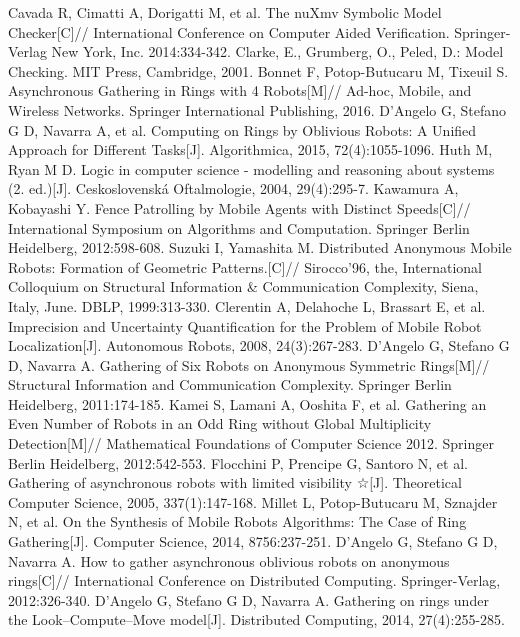 \begin{thebibliography}{0}
   Cavada R, Cimatti A, Dorigatti M, et al. The nuXmv Symbolic Model Checker[C]// International Conference on Computer Aided Verification. Springer-Verlag New York, Inc. 2014:334-342.
   Clarke, E., Grumberg, O., Peled, D.: Model Checking. MIT Press, Cambridge, 2001.
   Bonnet F, Potop-Butucaru M, Tixeuil S. Asynchronous Gathering in Rings with 4 Robots[M]// Ad-hoc, Mobile, and Wireless Networks. Springer International Publishing, 2016.
   D’Angelo G, Stefano G D, Navarra A, et al. Computing on Rings by Oblivious Robots: A Unified Approach for Different Tasks[J]. Algorithmica, 2015, 72(4):1055-1096.
   Huth M, Ryan M D. Logic in computer science - modelling and reasoning about systems (2. ed.)[J]. Ceskoslovenská Oftalmologie, 2004, 29(4):295-7.
   Kawamura A, Kobayashi Y. Fence Patrolling by Mobile Agents with Distinct Speeds[C]// International Symposium on Algorithms and Computation. Springer Berlin Heidelberg, 2012:598-608.
   Suzuki I, Yamashita M. Distributed Anonymous Mobile Robots: Formation of Geometric Patterns.[C]// Sirocco'96, the, International Colloquium on Structural Information & Communication Complexity, Siena, Italy, June. DBLP, 1999:313-330.
   Clerentin A, Delahoche L, Brassart E, et al. Imprecision and Uncertainty Quantification for the Problem of Mobile Robot Localization[J]. Autonomous Robots, 2008, 24(3):267-283.
   D'Angelo G, Stefano G D, Navarra A. Gathering of Six Robots on Anonymous Symmetric Rings[M]// Structural Information and Communication Complexity. Springer Berlin Heidelberg, 2011:174-185.
   Kamei S, Lamani A, Ooshita F, et al. Gathering an Even Number of Robots in an Odd Ring without Global Multiplicity Detection[M]// Mathematical Foundations of Computer Science 2012. Springer Berlin Heidelberg, 2012:542-553.
   Flocchini P, Prencipe G, Santoro N, et al. Gathering of asynchronous robots with limited visibility ☆[J]. Theoretical Computer Science, 2005, 337(1):147-168.
   Millet L, Potop-Butucaru M, Sznajder N, et al. On the Synthesis of Mobile Robots Algorithms: The Case of Ring Gathering[J]. Computer Science, 2014, 8756:237-251.
   D'Angelo G, Stefano G D, Navarra A. How to gather asynchronous oblivious robots on anonymous rings[C]// International Conference on Distributed Computing. Springer-Verlag, 2012:326-340.
   D’Angelo G, Stefano G D, Navarra A. Gathering on rings under the Look–Compute–Move model[J]. Distributed Computing, 2014, 27(4):255-285.

\end{thebibliography}
